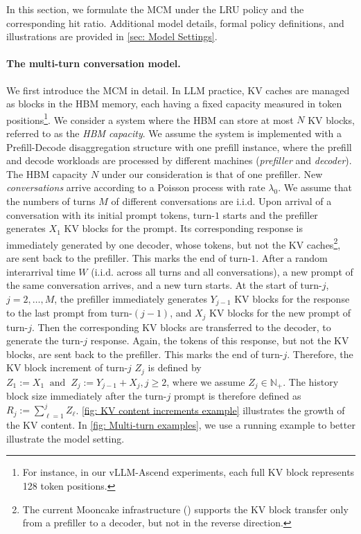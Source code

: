 \documentclass{article}
\theoremstyle{definition}
\newcommand{\N}{\mathbb N}
\begin{document}
In this section, we formulate the MCM under the LRU policy and the corresponding  hit ratio. Additional model details, formal policy definitions, and illustrations are provided in \cref{sec: Model Settings}. 

\vspace{-0.5em}

\paragraph{The multi-turn conversation model.}
We first introduce the MCM in detail.
In LLM practice, KV caches are managed as blocks in the HBM memory, each having a fixed capacity measured in token positions\footnote{For instance, in our vLLM-Ascend experiments, each full KV block represents 128 token positions.}. We consider a system where the HBM can store at most $N$ KV blocks, referred to as the \textit{HBM capacity}. We assume the system is implemented with a Prefill-Decode disaggregation structure with one prefill instance, where the prefill and decode workloads are processed by different machines (\textit{prefiller} and \textit{decoder}). The HBM capacity $N$ under our consideration is that of one prefiller. New \textit{conversations} arrive according to a Poisson process with rate $\lambda_0$.  
We assume that the numbers of turns $M$ of different conversations are i.i.d.
Upon arrival of a conversation with its initial prompt tokens, turn-$1$ starts and the prefiller generates $X_1$ KV blocks for the prompt. Its corresponding response is immediately generated by one decoder, whose tokens, but not the KV caches\footnote{The current Mooncake infrastructure (\cite{qin2025mooncake}) supports the KV block transfer only from a prefiller to a decoder, but not in the reverse direction.}, are sent back to the prefiller. This marks the end of turn-$1$. After a random interarrival time $W$ (i.i.d. across all turns and all conversations), a new prompt of the same conversation arrives, and a new turn starts.  
At the start of turn-$j$, $j=2, \ldots, M$, the prefiller immediately generates $Y_{j-1}$ KV blocks for the response to the last prompt from turn-$(j-1)$, and $X_j$ KV blocks for the new prompt of turn-$j$. Then the corresponding KV blocks are transferred to the decoder, to generate the turn-$j$ response. Again, the tokens of this response, but not the KV blocks, are sent back to the prefiller. This marks the end of turn-$j$. Therefore, the KV block increment of turn-$j$ $Z_j$ is defined by $Z_1:=X_1 ~\text{ and }~ Z_j:=Y_{j-1} + X_j, j\geq2$,
where we assume $Z_j\in\N_+$. The history block size immediately after the turn-$j$ prompt is therefore defined as $R_j:=\sum_{\ell=1}^{j}Z_\ell$. \cref{fig: KV content increments example} illustrates the growth of the KV content. In \cref{fig: Multi-turn examples}, we use a running example to better illustrate the model setting.
\end{document}
